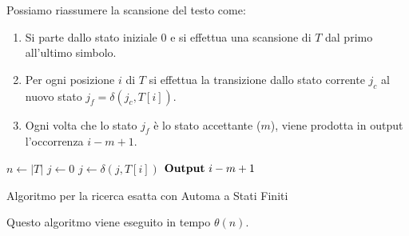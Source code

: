Possiamo riassumere la scansione del testo come:
\begin{enumerate}
    \item Si parte dallo stato iniziale $0$ e si effettua una scansione di $T$
          dal primo all'ultimo simbolo.
    \item Per ogni posizione $i$ di $T$ si effettua la transizione dallo stato
          corrente $j_c$ al nuovo stato $j_f = \delta(j_c, T[i])$.
    \item Ogni volta che lo stato $j_f$ è lo stato accettante ($m$), viene prodotta
          in output l'occorrenza $i - m + 1$.
\end{enumerate}
\begin{algorithm}
    \begin{algorithmic}
        \State $n \gets |T|$
        \State $j \gets 0$
        \State $j \gets \delta(j, T[i])$
        \State $\text{\textbf{Output}} \ i - m + 1$
        \EndIf
        \EndFor
        \EndFunction
    \end{algorithmic}
    \caption{Algoritmo per la ricerca esatta con Automa a Stati Finiti}
\end{algorithm}
Questo algoritmo viene eseguito in tempo $\theta(n)$.
